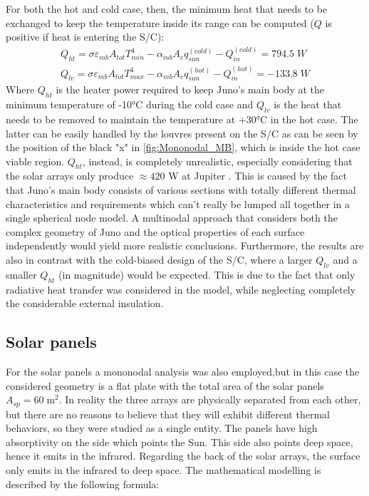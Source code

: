 For both the hot and cold case, then, the minimum heat that needs to be exchanged to keep the temperature inside its range can be computed ($Q$ is positive if heat is entering the S/C):
\begin{gather}
    Q_{ht} = \sigma \varepsilon_{mb} A_{tot} T_{min}^4 - \alpha_{mb} A_c q_{sun}^{(cold)} - Q_{in}^{(cold)} = 794.5 \; W
    \label{eq:mb_mono_cold_heat}
    \\
    Q_{lv} = \sigma \varepsilon_{mb} A_{tot} T_{max}^4 - \alpha_{mb} A_c q_{sun}^{(hot)} - Q_{in}^{(hot)} = -133.8 \; W
    \label{eq:mb_mono_hot_heat}
\end{gather}
Where $Q_{ht}$ is the heater power required to keep Juno's main body at the minimum temperature of -10°C during the cold case and $Q_{lv}$ is the heat that needs to be removed to maintain the temperature at +30°C in the hot case. The latter can be easily handled by the louvres present on the S/C as can be seen by the position of the black "x" in \autoref{fig:Mononodal_MB}, which is inside the hot case viable region. $Q_{ht}$, instead, is completely unrealistic, especially considering that the solar arrays only produce $\approx 420$ W at Jupiter \cite{solar_panels_coef}. This is caused by the fact that Juno's main body consists of various sections with totally different thermal characteristics and requirements which can't really be lumped all together in a single spherical node model. A multinodal approach that considers both the complex geometry of Juno and the optical properties of each surface independently would yield more realistic conclusions. Furthermore, the results are also in contrast with the cold-biased design of the S/C, where a larger $Q_{lv}$ and a smaller $Q_{ht}$ (in magnitude) would be expected. This is due to the fact that only radiative heat transfer was considered in the model, while neglecting completely the considerable external insulation. 


\subsection{Solar panels}
\label{subsec:solar_arrays_sizing}

For the solar panels a mononodal analysis was also employed,but in this case the considered geometry is a flat plate with the total area of the solar panels $A_{sp} = 60 \; \textrm{m}^2$. In reality the three arrays are physically separated from each other, but there are no reasons to believe that they will exhibit different thermal behaviors, so they were studied as a single entity. 
The panels have high absorptivity on the side which points the Sun. This side also points deep space, hence it emits in the infrared. Regarding the back of the solar arrays, the surface only emits in the infrared to deep space.
The mathematical modelling is described by the following formula:

